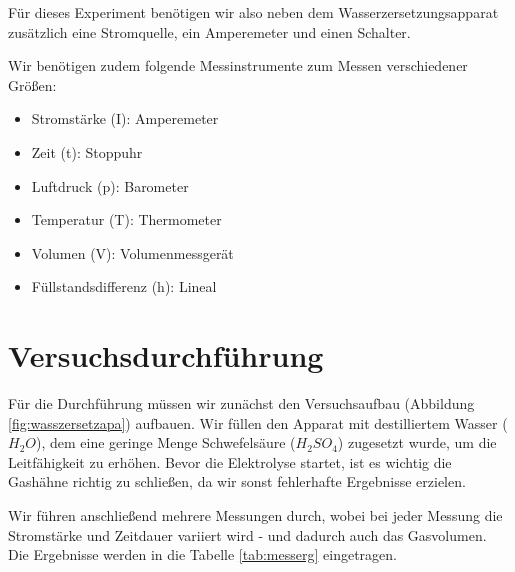 \documentclass[10pt,a4paper]{article}
\begin{document}
\begin{flushleft}
Für dieses Experiment benötigen wir also neben dem Wasserzersetzungsapparat zusätzlich eine Stromquelle, ein Amperemeter und einen Schalter.

Wir benötigen zudem folgende Messinstrumente zum Messen verschiedener Größen:
\begin{itemize}[itemsep=0pt]
\item Stromstärke (I): Amperemeter
\item Zeit (t): Stoppuhr
\item Luftdruck (p): Barometer
\item Temperatur (T): Thermometer
\item Volumen (V): Volumenmessgerät
\item Füllstandsdifferenz (h): Lineal
\end{itemize}
\end{flushleft}

\section{Versuchsdurchführung}
\begin{flushleft}
Für die Durchführung müssen wir zunächst den Versuchsaufbau (Abbildung \ref{fig:wasszersetzapa}) aufbauen. Wir füllen den Apparat mit destilliertem Wasser ($H_2O$), dem eine geringe Menge Schwefelsäure ($H_2SO_4$) zugesetzt wurde, um die Leitfähigkeit zu erhöhen. Bevor die Elektrolyse startet, ist es wichtig die Gashähne richtig zu schließen, da wir sonst fehlerhafte Ergebnisse erzielen.

Wir führen anschließend mehrere Messungen durch, wobei bei jeder Messung die Stromstärke und Zeitdauer variiert wird - und dadurch auch das Gasvolumen. Die Ergebnisse werden in die Tabelle \ref{tab:messerg} eingetragen.
\end{flushleft}
\end{document}
